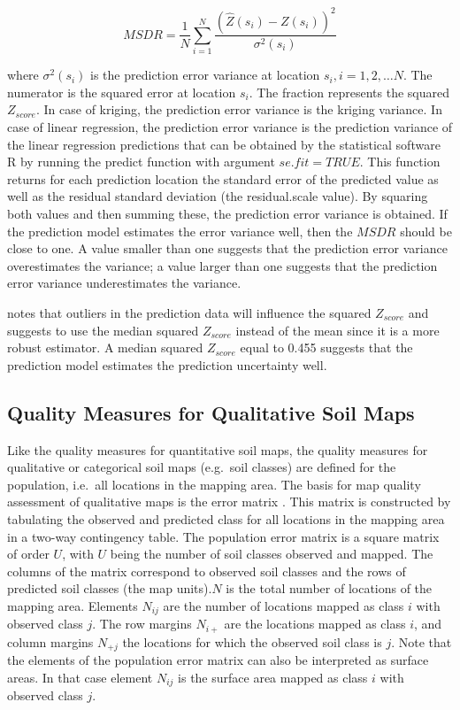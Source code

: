 \documentclass[10pt,b5paper,]{book}
\theoremstyle{definition}
\theoremstyle{definition}
\theoremstyle{definition}
\theoremstyle{remark}
\begin{document}
\begin{equation}
M S D R = \frac{1}{N} \sum_{i=1}^{N} \frac{(\hat{Z}(s_i) - Z(s_i))^2}{\sigma^2(s_i)}
\end{equation}

where \({\sigma^2(s_i)}\) is the prediction error variance at location
\({s_i, i = 1, 2, \dots N}\). The numerator is the squared error at
location \({s_i}\). The fraction represents the squared \({Z_{score}}\).
In case of kriging, the prediction error variance is the kriging
variance. In case of linear regression, the prediction error variance is
the prediction variance of the linear regression predictions that can be
obtained by the statistical software R by running the predict function
with argument \({se.fit = TRUE}\). This function returns for each
prediction location the standard error of the predicted value as well as
the residual standard deviation (the residual.scale value). By squaring
both values and then summing these, the prediction error variance is
obtained. If the prediction model estimates the error variance well,
then the \({MSDR}\) should be close to one. A value smaller than one
suggests that the prediction error variance overestimates the variance;
a value larger than one suggests that the prediction error variance
underestimates the variance.

\citet{lark2000comparison} notes that outliers in the prediction data
will influence the squared \({Z_{score}}\) and suggests to use the
median squared \({Z_{score}}\) instead of the mean since it is a more
robust estimator. A median squared \({Z_{score}}\) equal to 0.455
suggests that the prediction model estimates the prediction uncertainty
well.

\hypertarget{quality-measures-for-qualitative-soil-maps}{%
\subsection{Quality Measures for Qualitative Soil
Maps}\label{quality-measures-for-qualitative-soil-maps}}

Like the quality measures for quantitative soil maps, the quality
measures for qualitative or categorical soil maps (e.g.~soil classes)
are defined for the population, i.e.~all locations in the mapping area.
The basis for map quality assessment of qualitative maps is the error
matrix \citep[\citet{lark1995components}]{brus2011sampling}. This matrix
is constructed by tabulating the observed and predicted class for all
locations in the mapping area in a two-way contingency table. The
population error matrix is a square matrix of order \(U\), with \(U\)
being the number of soil classes observed and mapped. The columns of the
matrix correspond to observed soil classes and the rows of predicted
soil classes (the map units).\(N\) is the total number of locations of
the mapping area. Elements \(N_{ij}\) are the number of locations mapped
as class \(i\) with observed class \(j\). The row margins \(N_{i+}\) are
the locations mapped as class \(i\), and column margins \(N_{+j}\) the
locations for which the observed soil class is \(j\). Note that the
elements of the population error matrix can also be interpreted as
surface areas. In that case element \(N_{ij}\) is the surface area
mapped as class \(i\) with observed class \(j\).
\end{document}
